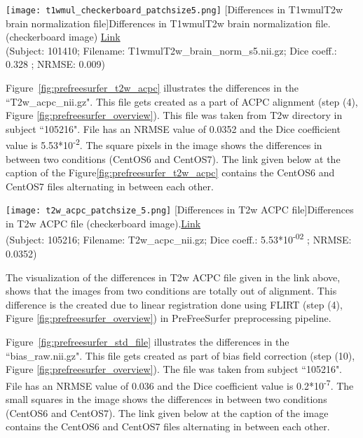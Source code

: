 \begin{center}
\texttt{[image: t1wmul\_checkerboard\_patchsize5.png]}
  [Differences in T1wmulT2w brain normalization file]{Differences in T1wmulT2w brain normalization file. (checkerboard image) \href{https://drive.google.com/file/d/1eHyrs180QbF4a-kSSz5mFkdirTgdXhc_/view?usp=sharing}{Link}\\(Subject: 101410; Filename: T1wmulT2w\_brain\_norm\_s5.nii.gz; Dice coeff.: 0.328 ; NRMSE: 0.009)}
\label{fig:prefreesurfer_t1w_mul}
\end{center}

Figure~\ref{fig:prefreesurfer_t2w_acpc} illustrates the differences in the ``T2w\_acpc\_nii.gz". This file gets created as a part of ACPC alignment (step (4), Figure \ref{fig:prefreesurfer_overview}). This file was taken from T2w directory in subject ``105216". File has an NRMSE value of 0.0352 and the Dice coefficient value is 5.53*10\textsuperscript{-2}. The square pixels in the image shows the differences in between two conditions (CentOS6 and CentOS7). The link given below at the caption of the Figure\ref{fig:prefreesurfer_t2w_acpc} contains the CentOS6 and CentOS7 files alternating in between each other.

\begin{center}
\texttt{[image: t2w\_acpc\_patchsize\_5.png]}
[Differences in T2w ACPC file]{Differences in T2w ACPC file (checkerboard image).\href{https://drive.google.com/file/d/1NrNl7POyCS_SZm3an00wOLUnkmLJ_ngo/view?usp=sharing}{Link}\\(Subject: 105216; Filename: T2w\_acpc\_nii.gz; Dice coeff.: 5.53*10\textsuperscript{-02} ; NRMSE: 0.0352)}
\label{fig:prefreesurfer_t2w_acpc}
\end{center}

The visualization of the differences in T2w ACPC file given in the link above, shows that the images from two conditions are totally out of alignment. This difference is the created due to linear registration done using FLIRT (step (4), Figure \ref{fig:prefreesurfer_overview}) in PreFreeSurfer preprocessing pipeline.

Figure~\ref{fig:prefreesurfer_std_file} illustrates the differences in the ``bias\_raw.nii.gz".
This file gets created as part of bias field correction (step (10), Figure \ref{fig:prefreesurfer_overview}). The file was taken from subject ``105216". File has an NRMSE value of 0.036 and the Dice coefficient value is 0.2*10\textsuperscript{-7}. The small squares in the image shows the differences in between two conditions (CentOS6 and CentOS7).
The link given below at the caption of the image contains the CentOS6 and CentOS7 files alternating in between each other.

